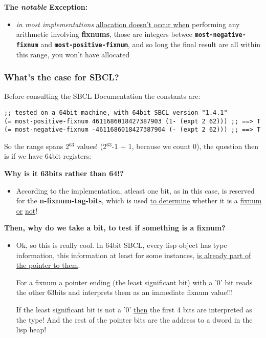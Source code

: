 \documentclass[11pt]{article}
\begin{document}
\textbf{The \emph{notable} Exception:}
\begin{itemize}
\item \emph{in most implementations} \uline{allocation doesn't occur when} performing any arithmetic
involving \textbf{fixnums}, those are integers betwee \textbf{\texttt{most-negative-fixnum}} and
\textbf{\texttt{most-positive-fixnum}}, and so long the final result are all within this range,
you won't have allocated
\end{itemize}

\subsubsection{What's the case for SBCL?}
\label{sec:org95fc672}
Before consulting the SBCL Documentation the constants are:

\begin{verbatim}
;; tested on a 64bit machine, with 64bit SBCL version "1.4.1"
(= most-positive-fixnum 4611686018427387903 (1- (expt 2 62))) ;; ==> T
(= most-negative-fixnum -4611686018427387904 (- (expt 2 62))) ;; ==> T
\end{verbatim}

So the range spans 2\(^{\text{63}}\) values! (2\(^{\text{63}}\)-1 + 1, because we count 0), the question then is
if we have 64bit registers:

\textbf{Why is it 63bits rather than 64!?}
\begin{itemize}
\item According to the implementation, atleast one bit, as in this case, is reserved for
the \textbf{n-fixnum-tag-bits}, which is used \uline{to determine} whether it is a \uline{fixnum or}
\uline{not}!
\end{itemize}

\textbf{Then, why do we take a bit, to test if something is a fixnum?}
\begin{itemize}
\item Ok, so this is really cool. In 64bit SBCL, every lisp object has type information, this
information at least for some instances, \uline{is already part of the pointer to them}.

For a fixnum a pointer ending (the least significant bit) with a '0' bit reads the
other 63bits and interprets them as an immediate fixnum value!!!

If the least significant bit is not a '0' \uline{then} the first 4 bits are interpreted
as the type! And the rest of the pointer bits are the address to a dword in the lisp
heap!
\end{itemize}
\end{document}
